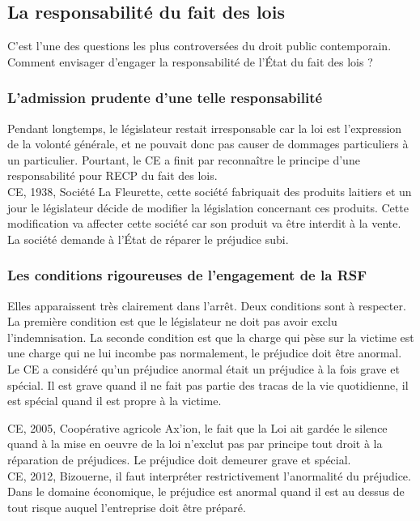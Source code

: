 \documentclass[10pt, a4paper, openany]{book}
\begin{document}
\subsection{La responsabilité du fait des lois}

C'est l'une des questions les plus controversées du droit public contemporain. Comment envisager d'engager la responsabilité de l'État du fait des lois ? 

\subsubsection{L'admission prudente d'une telle responsabilité}

Pendant longtemps, le législateur restait irresponsable car la loi est l'expression de la volonté générale, et ne pouvait donc pas causer de dommages particuliers à un particulier. Pourtant, le CE a finit par reconnaître le principe d'une responsabilité pour RECP du fait des lois. \\
CE, 1938, Société La Fleurette, cette société fabriquait des produits laitiers et un jour le législateur décide de modifier la législation concernant ces produits. Cette modification va affecter cette société car son produit va être interdit à la vente. La société demande à l'État de réparer le préjudice subi. 

\subsubsection{Les conditions rigoureuses de l'engagement de la RSF}

Elles apparaissent très clairement dans l'arrêt. Deux conditions sont à respecter. \\
La première condition est que le législateur ne doit pas avoir exclu l'indemnisation. La seconde condition est que la charge qui pèse sur la victime est une charge qui ne lui incombe pas normalement, le préjudice doit être anormal. Le CE a considéré qu'un préjudice anormal était un préjudice à la fois grave et spécial. Il est grave quand il ne fait pas partie des tracas de la vie quotidienne, il est spécial quand il est propre à la victime. 


CE, 2005, Coopérative agricole Ax'ion, le fait que la Loi ait gardée le silence quand à la mise en oeuvre de la loi n'exclut pas par principe tout droit à la réparation de préjudices. Le préjudice doit demeurer grave et spécial. \\
CE, 2012, Bizouerne, il faut interpréter restrictivement l'anormalité du préjudice. Dans le domaine économique, le préjudice est anormal quand il est au dessus de tout risque auquel l'entreprise doit être préparé. 
\end{document}

